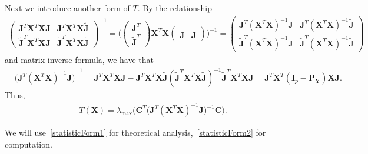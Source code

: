 \documentclass[12pt]{article} %
\newcommand{\bX}{\mathbf{X}}
\newcommand{\bP}{\mathbf{P}}
\newcommand{\bY}{\mathbf{Y}}
\newcommand{\bJ}{\mathbf{J}}
\newcommand{\bC}{\mathbf{C}}
\newcommand{\bI}{\mathbf{I}}
\theoremstyle{definition}
\begin{document}
Next we introduce another form of $T$.
By the relationship
\begin{equation*}
    \begin{aligned}
        \begin{pmatrix}
            \bJ^T \bX^T \bX\bJ & \bJ^T \bX^T \bX\tilde{\bJ}\\
            \tilde{\bJ}^T \bX^T \bX \bJ & \tilde{\bJ}^T \bX^T \bX \tilde{\bJ}
        \end{pmatrix}^{-1}
        =
        \Big(
        \begin{pmatrix}
            \bJ^T\\
            \tilde{\bJ}^T
        \end{pmatrix}
        \bX^T \bX
        \begin{pmatrix}
            \bJ &\tilde{\bJ}
        \end{pmatrix}
        \Big)^{-1}
        =
        \begin{pmatrix}
            \bJ^T {(\bX^T \bX)}^{-1}\bJ & \bJ^T {(\bX^T \bX)}^{-1}\tilde{\bJ}\\
            \tilde{\bJ}^T {(\bX^T \bX)}^{-1}\bJ & \tilde{\bJ}^T {(\bX^T \bX)}^{-1} \tilde{\bJ}
        \end{pmatrix}
    \end{aligned}
\end{equation*}
and matrix inverse formula, we have that
\begin{equation*}
    \begin{aligned}
        &{\big( \bJ^T {(\bX^T \bX)}^{-1}\bJ \big)}^{-1}
        =\bJ^T \bX^T \bX \bJ - \bJ^T \bX^T \bX\tilde{\bJ}{(\tilde{\bJ}^T \bX^T \bX \tilde{\bJ})}^{-1}
            \tilde{\bJ}^T \bX^T \bX\bJ 
        = \bJ^T \bX^T( \bI_p- \bP_{\bY}) \bX \bJ.
    \end{aligned}
\end{equation*}
Thus, 
\begin{equation}\label{statisticForm2}
    \begin{aligned}
        T(\bX)=
        \lambda_{\max}\Big(\bC^T\big( \bJ^T (\bX^T \bX)^{-1}\bJ \big)^{-1}\bC\Big).
    \end{aligned}
\end{equation}

We will use~\eqref{statisticForm1} for theoretical analysis,~\eqref{statisticForm2} for computation.
\end{document}
